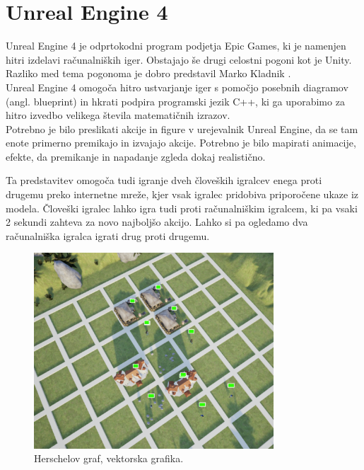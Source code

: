 \documentclass[a4paper, 12pt]{book}
\begin{document}
\section{Unreal Engine 4}

Unreal Engine 4 je odprtokodni program podjetja Epic Games, ki je namenjen hitri izdelavi računalniških iger. Obstajajo še drugi celostni pogoni kot je Unity.\\
Razliko med tema pogonoma je dobro predstavil Marko Kladnik \cite{diploma2}.\\
Unreal Engine 4 omogoča hitro ustvarjanje iger s pomočjo posebnih diagramov (angl. blueprint) in hkrati podpira programski jezik C++, ki ga uporabimo za hitro izvedbo velikega števila matematičnih izrazov.\\

Potrebno je bilo preslikati akcije in figure v urejevalnik Unreal Engine, da se tam enote primerno premikajo in izvajajo akcije.
Potrebno je bilo mapirati animacije, efekte, da premikanje in napadanje zgleda dokaj realistično.

Ta predstavitev omogoča tudi igranje dveh človeških igralcev enega proti drugemu preko internetne mreže, kjer vsak igralec pridobiva priporočene ukaze iz modela.
Človeški igralec lahko igra tudi proti računalniškim igralcem, ki pa vsaki 2 sekundi zahteva za novo najboljšo akcijo.
Lahko si pa ogledamo dva računalniška igralca igrati drug proti drugemu.

\begin{figure}[h]
	\begin{center}
		\includegraphics[width=0.8\textwidth]{visualization_ue4.pdf}
	\end{center}
	\caption{Herschelov graf, vektorska grafika.}
	\label{visualization_ue4}
\end{figure}
\end{document}
